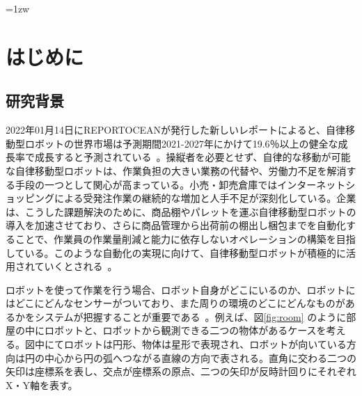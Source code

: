 \documentclass[a4paper]{jreport}	%
\begin{document}
\makecover

\addtolength{\textheight}{-5mm}	%
\setlength{\footskip}{15mm}	%
\fontsize{11pt}{15pt}\selectfont

\pagebreak\setcounter{page}{1}
\pagestyle{plain}
\tableofcontents
\listoffigures

\parindent=1zw	%
\pagebreak\setcounter{page}{1}
\pagestyle{plain}



\chapter{はじめに}
\section{研究背景}

2022年01月14日にREPORTOCEANが発行した新しいレポートによると、自律移動型ロボットの世界市場は予測期間2021-2027年にかけて19.6％以上の健全な成長率で成長すると予測されている~\cite{report1}。操縦者を必要とせず、自律的な移動が可能な自律移動型ロボットは、作業負担の大きい業務の代替や、労働力不足を解消する手段の一つとして関心が高まっている。小売・卸売倉庫ではインターネットショッピングによる受発注作業の継続的な増加と人手不足が深刻化している。企業は、こうした課題解決のために、商品棚やパレットを運ぶ自律移動型ロボットの導入を加速させており、さらに商品管理から出荷前の棚出し梱包までを自動化することで、作業員の作業量削減と能力に依存しないオペレーションの構築を目指している。このような自動化の実現に向けて、自律移動型ロボットが積極的に活用されていくとされる~\cite{report2}。

ロボットを使って作業を行う場合、ロボット自身がどこにいるのか、ロボットにはどこにどんなセンサーがついており、また周りの環境のどこにどんなものがあるかをシステムが把握することが重要である~\cite{tf}。例えば、図\ref{fig:room} のように部屋の中にロボットと、ロボットから観測できる二つの物体があるケースを考える。図中にてロボットは円形、物体は星形で表現され、ロボットが向いている方向は円の中心から円の弧へつながる直線の方向で表される。直角に交わる二つの矢印は座標系を表し、交点が座標系の原点、二つの矢印が反時計回りにそれぞれX・Y軸を表す。
\end{document}

